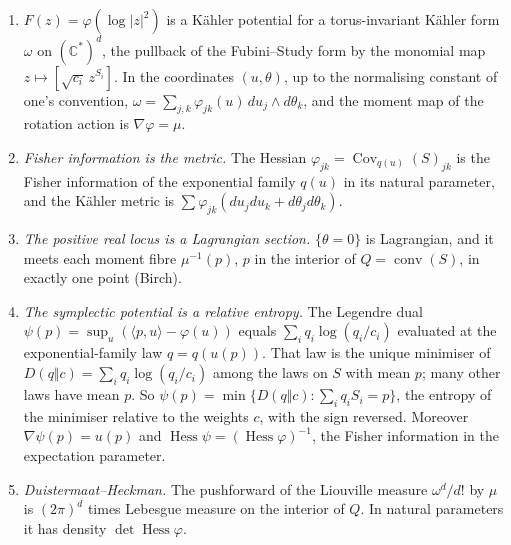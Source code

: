 \documentclass[11pt]{article}
\theoremstyle{definition}\newtheorem{definition}[theorem]{Definition}\newtheorem{remark}[theorem]{Remark}\newtheorem{example}[theorem]{Example}\newtheorem{problem}[theorem]{Open problem}\crefname{problem}{Problem}{Problems}
\begin{document}
\begin{proposition}\label{prop:kahler}
\begin{enumerate}
\item[(1)] $F(z)=\varphi(\log|z|^2)$ is a K\"ahler potential for a torus-invariant K\"ahler form $\omega$ on $(\mathbb C^*)^d$, the pullback of the Fubini--Study form by the
  monomial map $z\mapsto[\sqrt{c_i}\,z^{S_i}]$. In the coordinates $(u,\theta)$, up to the normalising constant of one's convention,
  $\omega=\sum_{j,k}\varphi_{jk}(u)\,du_j\wedge d\theta_k$, and the moment map of the rotation action is $\nabla\varphi=\mu$.
\item[(2)] \emph{Fisher information is the metric.} The Hessian $\varphi_{jk}=\operatorname{Cov}_{q(u)}(S)_{jk}$ is the Fisher information of the exponential family
  $q(u)$ in its natural parameter, and the K\"ahler metric is $\sum\varphi_{jk}(du_jdu_k+d\theta_jd\theta_k)$.
\item[(3)] \emph{The positive real locus is a Lagrangian section.} $\{\theta=0\}$ is Lagrangian, and it meets each moment fibre $\mu^{-1}(p)$, $p$ in the interior
  of $Q=\operatorname{conv}(S)$, in exactly one point (Birch).
\item[(4)] \emph{The symplectic potential is a relative entropy.} The Legendre dual $\psi(p)=\sup_u(\langle p,u\rangle-\varphi(u))$ equals $\sum_iq_i\log(q_i/c_i)$ evaluated at
  the exponential-family law $q=q(u(p))$. That law is the unique minimiser of $D(q\Vert c)=\sum_iq_i\log(q_i/c_i)$ among the laws on $S$ with mean $p$; many other laws
  have mean $p$. So $\psi(p)=\min\{D(q\Vert c):\sum_i q_iS_i=p\}$, the entropy of the minimiser relative to the weights $c$, with the sign reversed. Moreover $\nabla\psi(p)=u(p)$ and $\operatorname{Hess}\psi=(\operatorname{Hess}\varphi)^{-1}$, the
  Fisher information in the expectation parameter.
\item[(5)] \emph{Duistermaat--Heckman.} The pushforward of the Liouville measure $\omega^d/d!$ by $\mu$ is $(2\pi)^d$ times Lebesgue measure on the interior of $Q$. In
  natural parameters it has density $\det\operatorname{Hess}\varphi$.
\end{enumerate}
\end{proposition}
\end{document}
